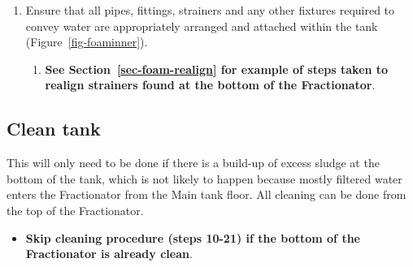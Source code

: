 \documentclass[
  letterpaper,
  DIV=11,
  numbers=noendperiod]{scrreprt}
\providecommand{\tightlist}{%
  \setlength{\itemsep}{0pt}\setlength{\parskip}{0pt}}\usepackage{longtable,booktabs,array}
\begin{document}
\begin{enumerate}
\def\labelenumi{\arabic{enumi}.}
\setcounter{enumi}{8}
\tightlist
\item
  Ensure that all pipes, fittings, strainers and any other fixtures
  required to convey water are appropriately arranged and attached
  within the tank (Figure~\ref{fig-foaminner}).

  \begin{enumerate}
  \def\labelenumii{\roman{enumii})}
  \tightlist
  \item
    \textbf{See Section~\ref{sec-foam-realign} for example of steps
    taken to realign strainers found at the bottom of the Fractionator}.
  \end{enumerate}
\end{enumerate}

\hypertarget{sec-foam-clean}{%
\subsection{Clean tank}\label{sec-foam-clean}}

{This will only need to be done if there is a build-up of excess sludge
at the bottom of the tank, which is not likely to happen because mostly
filtered water enters the Fractionator from the Main tank floor}. {All
cleaning can be done from the top of the Fractionator}.

\begin{itemize}
\tightlist
\item
  \textbf{Skip cleaning procedure (steps 10-21) if the bottom of the
  Fractionator is already clean}.
\end{itemize}
\end{document}
